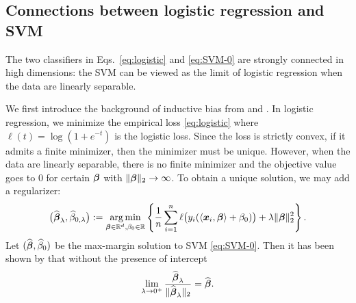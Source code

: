 \subsection{Connections between logistic regression and SVM}
\label{subsec:LR_vs_SVM}

The two classifiers in Eqs.~\eqref{eq:logistic} and \eqref{eq:SVM-0} are strongly connected in high dimensions: the SVM can be viewed as the limit of logistic regression when the data are linearly separable. 


We first introduce the background of inductive bias from \cite{rosset2003margin, rosset2004boosting} and \cite{Soudry_implicit_bias, ji2019riskparameterconvergencelogistic}. 
In logistic regression, we minimize the empirical loss \cref{eq:logistic}
where $\ell(t) = \log (1+e^{-t})$ is the logistic loss. Since the loss is strictly convex, if it admits a finite minimizer, then the minimizer must be unique. However, when the data are linearly separable, there is no finite minimizer and the objective value goes to $0$ for certain ${\boldsymbol{\beta}}$ with $\|{\boldsymbol{\beta}}\|_2 \to \infty$. To obtain a unique solution, we may add a regularizer:
\begin{equation}\label{eq:logistic-l2}
        \bigl( \widehat{{\boldsymbol{\beta}}}_\lambda, \widehat\beta_{0,\lambda} \bigr) := \operatorname*{arg\,min}_{{\boldsymbol{\beta}} \in \mathbb{R}^d, \beta_0 \in \mathbb{R}}
        \left\{
        \frac{1}{n} \sum_{i=1}^n \ell \bigl( y_i(\langle {\boldsymbol{x}}_i, {\boldsymbol{\beta}} \rangle + \beta_0) \bigr) +  \lambda \| {\boldsymbol{\beta}}\|_2^2 \right\}.
    \end{equation}
Let $(\widehat{{\boldsymbol{\beta}}}, \widehat\beta_{0})$
be the max-margin solution to SVM \cref{eq:SVM-0}. Then it has been shown by \cite{rosset2003margin, rosset2004boosting} that without the presence of intercept
\begin{equation}\label{eq:explicit_bias}
    \lim_{\lambda \to 0^+} \frac{\widehat {{\boldsymbol{\beta}}}_\lambda}{\| \widehat {{\boldsymbol{\beta}}}_\lambda \|_2} = \widehat {{\boldsymbol{\beta}}}.
\end{equation}

